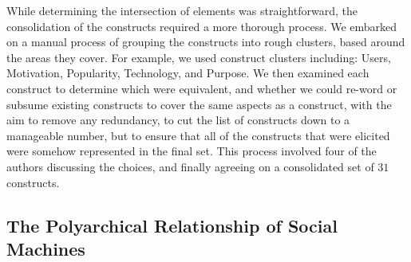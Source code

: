 \documentclass{sig-alternate}
\begin{document}
While determining the intersection of elements was straightforward, the consolidation of the
constructs required a more thorough process. We embarked on a manual process of grouping the constructs into rough clusters, based around the areas they cover. For example, we used construct
clusters including: Users, Motivation, Popularity, Technology, and Purpose. We then examined
each construct to determine which were equivalent, and whether we could re-word or subsume
existing constructs to cover the same aspects as a construct, with the aim to remove any
redundancy, to cut the list of constructs down to a manageable number, but to ensure that
all of the constructs that were elicited were somehow represented in the final set. This
process involved four of the authors discussing the choices, and finally agreeing on a
consolidated set of $31$ constructs.

%
%

\subsection{The Polyarchical Relationship of Social Machines}
\end{document}
